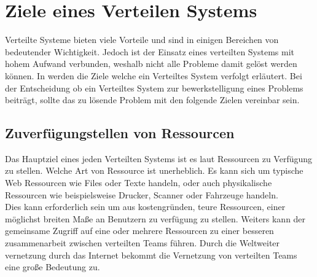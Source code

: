 \section{Ziele eines Verteilen Systems}\label{sec:distributedSystems:goales}
Verteilte Systeme bieten viele Vorteile und sind in einigen Bereichen von bedeutender Wichtigkeit. Jedoch ist der Einsatz eines verteilten Systems mit hohem Aufwand verbunden, weshalb nicht alle Probleme damit gelöst werden können. In \cite{tanenbaum2007distributed} werden die Ziele welche ein Verteiltes System verfolgt erläutert. Bei der Entscheidung ob ein Verteiltes System zur bewerkstelligung eines Problems beiträgt, sollte das zu lösende Problem mit den folgende Zielen vereinbar sein.

\subsection{Zuverfügungstellen von Ressourcen}\label{sec:distributedSystems:goales:resourceAccess} Das Hauptziel eines jeden Verteilten Systems ist es laut \cite{tanenbaum2007distributed} Ressourcen zu Verfügung zu stellen. Welche Art von Ressource ist unerheblich. Es kann sich um typische Web Ressourcen wie Files oder Texte handeln, oder auch physikalische Ressourcen wie beispielsweise Drucker, Scanner oder Fahrzeuge handeln.\\
Dies kann erforderlich sein um aus kostengründen, teure Ressourcen, einer möglichst breiten Maße an Benutzern zu verfügung zu stellen. Weiters kann der gemeinsame Zugriff auf eine oder mehrere Ressourcen zu einer besseren zusammenarbeit zwischen verteilten Teams führen. Durch die Weltweiter vernetzung durch das Internet bekommt die Vernetzung von verteilten Teams eine große Bedeutung zu. 
